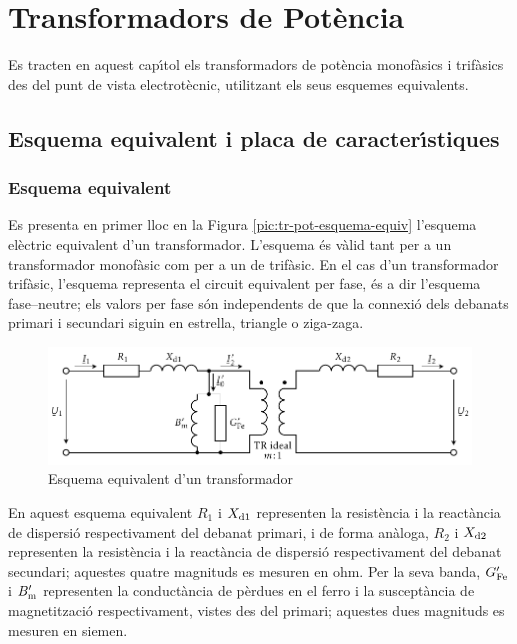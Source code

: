\chapter{Transformadors de Pot\`{e}ncia}

Es tracten en aquest cap\'{\i}tol els transformadors de pot\`{e}ncia
monof\`{a}sics i trif\`{a}sics des del punt de vista electrot\`{e}cnic, utilitzant els seus esquemes equivalents.

\section{Esquema equivalent i placa de caracter\'{\i}stiques}

\subsection{Esquema equivalent}

Es presenta en primer lloc en la Figura \vref{pic:tr-pot-esquema-equiv} l'esquema el\`{e}ctric equivalent d'un transformador.
L'esquema \'{e}s v\`{a}lid tant per a un transformador monof\`{a}sic com per a un de trif\`{a}sic. En el cas d'un transformador trif\`{a}sic, l'esquema representa el circuit equivalent per fase, \'{e}s a dir l'esquema fase--neutre; els valors per fase s\'{o}n independents de que la connexi\'{o} dels debanats primari i secundari siguin en estrella, triangle o ziga-zaga.

\begin{figure}[htb]
\centering
    \includegraphics{Imatges/Cap-TrafosPot-Esq-Equiv.pdf}
\caption{Esquema equivalent d'un transformador}
\label{pic:tr-pot-esquema-equiv}
\end{figure}

En aquest esquema equivalent $R_1$ i $X_\mathrm{d1}$ representen la resist\`{e}ncia i la react\`{a}ncia de dispersi\'{o} respectivament del debanat primari, i de forma an\`{a}loga, $R_2$ i $X_\mathrm{d2}$ representen la resist\`{e}ncia i la react\`{a}ncia de dispersi\'{o} respectivament del debanat secundari; aquestes quatre magnituds es mesuren en ohm. Per la seva banda, $G_\mathrm{Fe}'$ i $B_\mathrm{m}'$ representen la conduct\`{a}ncia de p\`{e}rdues en el ferro i la suscept\`{a}ncia de magnetitzaci\'{o} respectivament, vistes des del primari; aquestes dues magnituds es mesuren en siemen.

